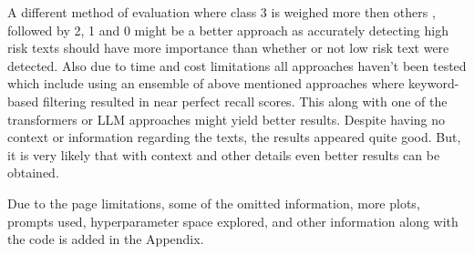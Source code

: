 \documentclass[10pt, a4paper]{article}
\begin{document}
A different method of evaluation where class 3 is weighed more then others , followed by 2, 1 and 0 might be a better approach as accurately detecting high risk texts should have more importance than whether or not low risk text were detected. Also due to time and cost limitations all approaches haven't been tested which include using an ensemble of above mentioned approaches where keyword-based filtering resulted in near perfect recall scores. This along with one of the transformers or LLM approaches might yield better results. Despite having no context or information regarding the texts, the results appeared quite good. But, it is very likely that with context and other details even better results can be obtained.

Due to the page limitations, some of the omitted information, more plots, prompts used, hyperparameter space explored, and other information along with the code is added in the Appendix.
\end{document}
